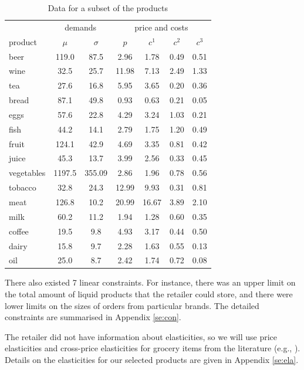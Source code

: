 \documentclass[a4paper,11pt]{article}
\begin{document}
\begin{table}[htb]
\centering
\caption{Data for a subset of the products}
\label{tab:real_par}
\begin{tabular}{lcc cccc}
\toprule
& \multicolumn{2}{c}{demands} & \multicolumn{4}{c}{price and costs}\\
\cmidrule(lr){2-3} \cmidrule(lr){4-7}
product & $\mu$ & $\sigma$ & $p$ & $c^1$ & $c^2$ & $c^3$\\
\midrule
beer & 119.0 & 87.5 & 2.96 & 1.78 & 0.49 & 0.51\\
wine & 32.5 & 25.7 & 11.98 & 7.13 & 2.49 & 1.33\\
tea & 27.6 & 16.8 & 5.95 & 3.65 & 0.20 & 0.36\\
bread & 87.1 & 49.8 & 0.93 & 0.63 & 0.21 & 0.05\\
eggs & 57.6 & 22.8 & 4.29 & 3.24 & 1.03 & 0.21\\
\addlinespace
fish & 44.2 & 14.1 & 2.79 & 1.75 & 1.20 & 0.49\\
fruit & 124.1 & 42.9 & 4.69 & 3.35 & 0.81 & 0.42\\
juice & 45.3 & 13.7 & 3.99 & 2.56 & 0.33 & 0.45\\
vegetables & 1197.5 & 355.09 & 2.86 & 1.96 & 0.78 & 0.56\\
tobacco & 32.8 & 24.3 & 12.99 & 9.93 & 0.31 & 0.81\\
\addlinespace
meat & 126.8 & 10.2 & 20.99 & 16.67 & 3.89 & 2.10\\
milk & 60.2 & 11.2 & 1.94 & 1.28 & 0.60 & 0.35\\
coffee & 19.5 & 9.8 & 4.93 & 3.17 & 0.44 & 0.50\\
dairy & 15.8 & 9.7 & 2.28 & 1.63 & 0.55 & 0.13\\
oil & 25.0 & 8.7 & 2.42 & 1.74 & 0.72 & 0.08\\
\bottomrule
\end{tabular}
\end{table}

There also existed 7 linear constraints. For instance, there was an upper limit on the total amount of liquid products that the retailer could store, and there were lower limits on the sizes of orders from particular brands. The detailed constraints are summarised in Appendix \ref{se:con}.

The retailer did not have information about elasticities, so we will use price elasticities and cross-price elasticities for grocery items from the literature (e.g., \cite{HPQ99,LC03,VD99,ZW03}). Details on the elasticities for our selected products are given in Appendix \ref{se:ela}.
\end{document}
